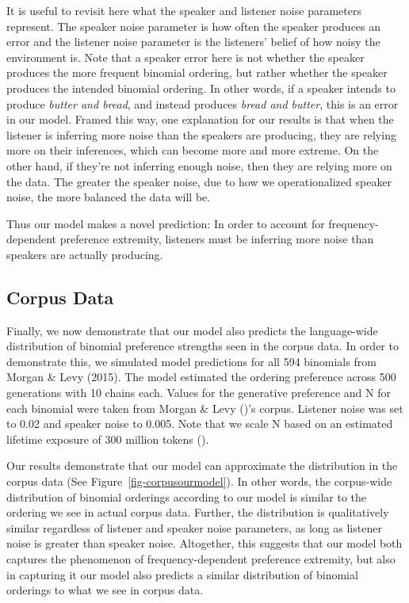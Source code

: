 \documentclass[
  12pt,
  letterpaper,
]{scrreport}
\begin{document}
It is useful to revisit here what the speaker and listener noise
parameters represent. The speaker noise parameter is how often the
speaker produces an error and the listener noise parameter is the
listeners' belief of how noisy the environment is. Note that a speaker
error here is not whether the speaker produces the more frequent
binomial ordering, but rather whether the speaker produces the intended
binomial ordering. In other words, if a speaker intends to produce
\emph{butter and bread}, and instead produces \emph{bread and butter},
this is an error in our model. Framed this way, one explanation for our
results is that when the listener is inferring more noise than the
speakers are producing, they are relying more on their inferences, which
can become more and more extreme. On the other hand, if they're not
inferring enough noise, then they are relying more on the data. The
greater the speaker noise, due to how we operationalized speaker noise,
the more balanced the data will be.

Thus our model makes a novel prediction: In order to account for
frequency-dependent preference extremity, listeners must be inferring
more noise than speakers are actually producing.

\subsection{Corpus Data}\label{corpus-data}

Finally, we now demonstrate that our model also predicts the
language-wide distribution of binomial preference strengths seen in the
corpus data. In order to demonstrate this, we simulated model
predictions for all 594 binomials from Morgan \& Levy (2015). The model
estimated the ordering preference across 500 generations with 10 chains
each. Values for the generative preference and N for each binomial were
taken from Morgan \& Levy ()'s corpus.
Listener noise was set to 0.02 and speaker noise to 0.005. Note that we
scale N based on an estimated lifetime exposure of 300 million tokens
().

Our results demonstrate that our model can approximate the distribution
in the corpus data (See Figure~\ref{fig-corpusourmodel}). In other
words, the corpus-wide distribution of binomial orderings according to
our model is similar to the ordering we see in actual corpus data.
Further, the distribution is qualitatively similar regardless of
listener and speaker noise parameters, as long as listener noise is
greater than speaker noise. Altogether, this suggests that our model
both captures the phenomenon of frequency-dependent preference
extremity, but also in capturing it our model also predicts a similar
distribution of binomial orderings to what we see in corpus data.
\end{document}
